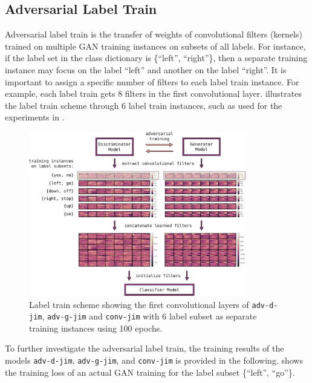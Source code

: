 \subsection{Adversarial Label Train}
Adversarial label train is the transfer of weights of convolutional filters (kernels) trained on multiple GAN training instances on subsets of all labels.
For instance, if the label set in the class dictionary is \{\enquote{left}, \enquote{right}\}, then a separate training instance may focus on the label \enquote{left} and another on the label \enquote{right}.
It is important to assign a specific number of filters to each label train instance.
For example, each label train gets 8 filters in the first convolutional layer.
 illustrates the label train scheme through 6 label train instances, such as used for the experiments in .
\begin{figure}[!ht]
  \centering
    \includegraphics[width=0.85\textwidth]{./4_nn/figs/nn_adv_label_scheme.pdf}
  \caption{Label train scheme showing the first convolutional layers of \texttt{adv-d-jim}, \texttt{adv-g-jim} and \texttt{conv-jim} with 6 label subset as separate training instances using 100 epochs.}
  \label{fig:nn_adv_label_scheme}
\end{figure}
\FloatBarrier
\noindent
To further investigate the adversarial label train, the training results of the models \texttt{adv-d-jim}, \texttt{adv-g-jim}, and \texttt{conv-jim} is provided in the following.
 shows the training loss of an actual GAN training for the label subset \{\enquote{left}, \enquote{go}\}.
